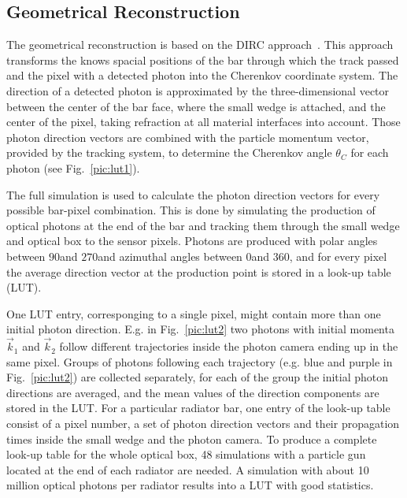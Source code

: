 \subsection{Geometrical Reconstruction}
\label{sec:gr}

The geometrical reconstruction is based on the \babar DIRC approach~\cite{bdirc1}. This approach transforms the knows spacial positions of the bar through which the track passed and the pixel with a detected photon into the Cherenkov coordinate system. The direction of a detected photon is approximated by the three-dimensional vector between the center of the bar face, where the small wedge is attached, and the center of the pixel, taking refraction at all material interfaces into account. Those photon direction vectors are combined with the particle momentum vector, provided by the tracking system, to determine the Cherenkov angle $\theta_{C}$ for each photon (see Fig.~\ref{pic:lut1}). 

The full simulation is used to calculate the photon direction vectors for every possible bar-pixel combination. This is done by simulating the production of optical photons at the end of the bar and tracking them through the small wedge and optical box to the sensor pixels. Photons are produced with polar angles between $90$\mydeg and $270$\mydeg and azimuthal angles between $0$\mydeg and $360$\mydeg, and for every pixel the average direction vector at the production point is stored in a look-up table (LUT).

One LUT entry, corresponging to a single pixel, might contain more than one initial photon direction. E.g. in Fig.~\ref{pic:lut2} two photons with initial momenta $\vec k_1$ and $\vec k_2$ follow different trajectories inside the photon camera ending up in the same pixel. 
Groups of photons following each trajectory (e.g. blue and purple in Fig.~\ref{pic:lut2}) are collected separately, for each of the group the initial photon directions are averaged, and the mean values of the direction components are stored in the LUT. For a particular radiator bar, one entry of the look-up table consist of a pixel number, a set of photon direction vectors and their propagation times inside the small wedge and the photon camera. To produce a complete look-up table for the whole optical box, 48 simulations with a particle gun located at the end of each radiator are needed. A simulation with about 10 million optical photons per radiator results into a LUT with good statistics.

